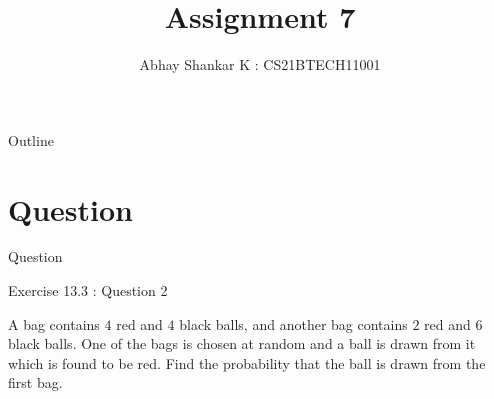 \documentclass{beamer}
\DeclareMathOperator*{\pipe}{|}
\begin{document}
	\title{Assignment 7}
		\author{ Abhay Shankar K : CS21BTECH11001}

	\begin{frame}
    		\titlepage 
	\end{frame}


	\providecommand{\brak}[1]{\ensuremath{\left(#1\right)}}
	\providecommand{\sbrak}[1]{\ensuremath{\left[#1\right]}}
	\providecommand{\cbrak}[1]{\ensuremath{\left\{#1\right\}}}
	\newcommand{\req}{\noindent \textbf{Required: }}
	\providecommand{\rpr}[2]{\ensuremath{P_{#1}\left(#2\right)}} %
	\providecommand{\spr}[1]{\ensuremath{P\left(#1\right)}} %
	\providecommand{\cpr}[2]{\ensuremath{\spr{#1 \pipe #2}}} %


	\begin{frame}{Outline}
    		\tableofcontents
	\end{frame}


	\section{Question}
		\begin{frame}{Question}

			\begin{block}{Exercise 13.3 : Question 2}
			
				A bag contains $4$ red and $4$ black balls, and another bag contains $2$ red and $6$ black balls. One of the bags is chosen at random and a ball is drawn from it which is found to be red. Find the probability that the ball is drawn from the first bag.
			
			\end{block}

		\end{frame}
\end{document}
